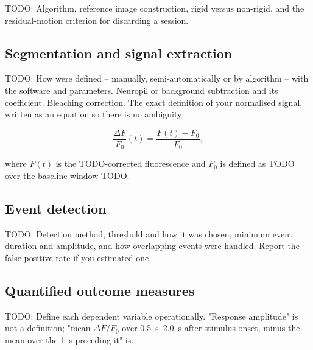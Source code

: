 			TODO: Algorithm, reference image construction, rigid versus
			non-rigid, and the residual-motion criterion for discarding a
			session.

		\subsection{Segmentation and signal extraction}

			TODO: How  were defined -- manually, semi-automatically
			or by algorithm -- with the software and parameters. Neuropil or
			background subtraction and its coefficient. Bleaching correction.
			The exact definition of your normalised signal, written as an
			equation so there is no ambiguity:

			\begin{equation}\label{equation:methods:dff}
				\frac{\Delta F}{F_0}(t) = \frac{F(t) - F_0}{F_0},
			\end{equation}

			where $F(t)$ is the TODO-corrected fluorescence and $F_0$ is
			defined as TODO over the baseline window TODO.

		\subsection{Event detection}

			TODO: Detection method, threshold and how it was chosen, minimum
			event duration and amplitude, and how overlapping events were
			handled. Report the false-positive rate if you estimated one.

		\subsection{Quantified outcome measures}

			TODO: Define each dependent variable operationally. "Response
			amplitude" is not a definition; "mean $\Delta F/F_0$ over
			\SIrange{0.5}{2.0}{\second} after stimulus onset, minus the mean
			over the \SI{1}{\second} preceding it" is.

	

